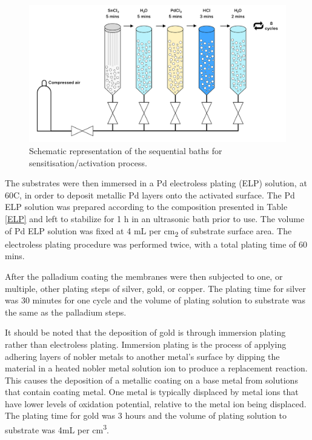 \begin{figure}
    \includegraphics[width=\linewidth]{figures/pretreatment.png}
    \caption{Schematic representation of the sequential baths for sensitisation/activation process.}
    \label{sintering}
  \end{figure}

The substrates were then immersed in a Pd electroless plating (ELP) solution, at 60\textdegree C, in order to deposit metallic Pd layers onto the activated surface. The Pd ELP solution was prepared according to the composition presented in Table \ref{ELP} and left to stabilize for 1 h in an ultrasonic bath prior to use. The volume of Pd ELP solution was fixed at 4 mL per cm\textsubscript{2} of 
substrate surface area. The electroless plating procedure was performed twice, with a total plating time of 60 mins.

After the palladium coating the membranes were then subjected to one, or multiple, other plating steps of silver, gold, or copper. The plating time for silver was 30 minutes for one cycle and the volume of plating solution to substrate was the same as the palladium steps.

It should be noted that the deposition of gold is through immersion plating rather than electroless plating. Immersion plating is the process of applying adhering layers of nobler metals to another metal's surface by dipping the material in a heated nobler metal solution ion to produce a replacement reaction. This causes the deposition of a metallic coating on a base metal from solutions that contain coating metal. One metal is typically displaced by metal ions that have lower levels of oxidation potential, relative to the metal ion being displaced. The plating time for gold was 3 hours and the volume of plating solution to substrate was 4mL per cm\textsuperscript{3}. 

